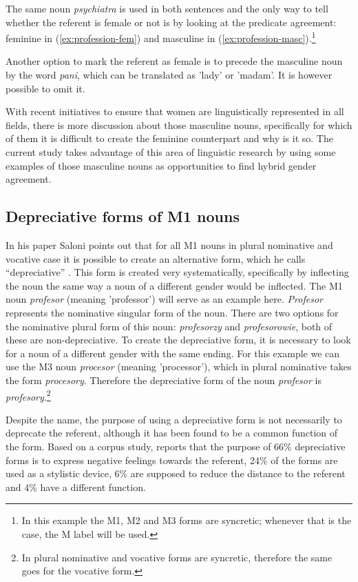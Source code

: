 The same noun \textsl{psychiatra} is used in both sentences and the only way to tell whether the referent is female or not is by looking at the predicate agreement: feminine in (\ref{ex:profession-fem}) and masculine in (\ref{ex:profession-masc}).\footnote{In this example the M1, M2 and M3 forms are syncretic; whenever that is the case, the M label will be used.}

Another option to mark the referent as female is to precede the masculine noun by the word \textsl{pani}, which can be translated as 'lady' or 'madam'. It is however possible to omit it.

With recent initiatives to ensure that women are linguistically represented in all fields, there is more discussion about those masculine nouns, specifically for which of them it is difficult to create the feminine counterpart and why is it so. The current study takes advantage of this area of linguistic research by using some examples of those masculine nouns as opportunities to find hybrid gender agreement.

\subsection{Depreciative forms of M1 nouns}
In his paper Saloni points out that for all M1 nouns in plural nominative and vocative case it is possible to create an alternative form, which he calls ``depreciative'' \citep{saloni_o_1988}. This form is created very systematically, specifically by inflecting the noun the same way a noun of a different gender would be inflected. The M1 noun \textsl{profesor} (meaning 'professor') will serve as an example here. \textsl{Profesor} represents the nominative singular form of the noun. There are two options for the nominative plural form of this noun: \textsl{profesorzy} and \textsl{profesorowie}, both of these are non-depreciative. To create the depreciative form, it is necessary to look for a noun of a different gender with the same ending. For this example we can use the M3 noun \textsl{procesor} (meaning 'processor'), which in plural nominative takes the form \textsl{procesory}. Therefore the depreciative form of the noun \textsl{profesor} is \textsl{profesory}.\footnote{In plural nominative and vocative forms are syncretic, therefore the same goes for the vocative form.}

Despite the name, the purpose of using a depreciative form is not necessarily to deprecate the referent, although it has been found to be a common function of the form. Based on a corpus study, \cite{siuda_funkcje_2010} reports that the purpose of 66\% depreciative forms is to express negative feelings towards the referent, 24\% of the forms are used as a stylistic device, 6\% are supposed to reduce the distance to the referent and 4\% have a different function.

